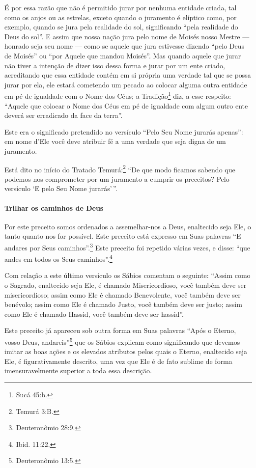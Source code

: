 É por essa razão que não é permitido jurar por nenhuma entidade criada,
tal como os anjos ou as estrelas, exceto quando o juramento é elíptico
como, por exemplo, quando se jura pela realidade do sol, significando
``pela realidade do Deus do sol''. E assim que nossa nação jura pelo
nome de Moisés nosso Mestre --- honrado seja seu nome --- como se aquele
que jura estivesse dizendo ``pelo Deus de Moisés'' ou ``por Aquele que
mandou Moisés''. Mas quando aquele que jurar não tiver a intenção de
dizer isso dessa forma e jurar por um ente criado, acreditando que essa
entidade contém em si própria uma verdade tal que se possa jurar por
ela, ele estará cometendo um pecado ao colocar alguma outra entidade em
pé de igualdade com o Nome dos Céus; a Tradição\footnote{Sucá 45:b.}
diz, a esse respeito: ``Aquele que colocar o Nome dos Céus em pé de
igualdade com algum outro ente deverá ser erradicado da face da terra''.

Este era o significado pretendido no versículo ``Pelo Seu Nome jurarás
apenas'': em nome d'Ele você deve atribuir fé a uma verdade que seja
digna de um juramento.

Está dito no início do Tratado Temurá:\footnote{Temurá 3:B.} ``De que
modo ficamos sabendo que podemos nos comprometer por um juramento a cumprir os preceitos? Pelo versículo `E pelo Seu Nome jurarás'\,''.

\paragraph{Trilhar os caminhos de Deus}

Por este preceito somos ordenados a assemelhar-nos a Deus, enaltecido
seja Ele, o tanto quanto nos for possível. Este preceito está expresso
em Suas palavras ``E andares por Seus caminhos''.\footnote{Deuteronômio 28:9.}
Este preceito foi repetido várias vezes, e disse: ``que andes em todos os Seus
caminhos''.\footnote{Ibid. 11:22.}

Com relação a este último versículo os Sábios comentam o seguinte:
``Assim como o Sagrado, enaltecido seja Ele, é chamado Misericordioso,
você também deve ser misericordioso; assim como Ele é chamado
Benevolente, você também deve ser benévolo; assim como Ele é chamado
Justo, você também deve ser justo; assim como Ele é chamado Hassid\starr,
você também deve ser hassid\starr''.

Este preceito já apareceu sob outra forma em Suas palavras ``Após o
Eterno, vosso Deus, andareis''\footnote{Deuteronômio 13:5.} que os Sábios
explicam como significando que devemos imitar as boas ações e os
elevados atributos pelos quais o Eterno, enaltecido seja Ele, é
figurativamente descrito, uma vez que Ele é de fato sublime de forma
imensuravelmente superior a toda essa descrição.



